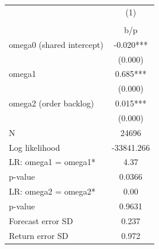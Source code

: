 {
\def\sym#1{\ifmmode^{#1}\else\(^{#1}\)\fi}
\begin{tabular}{l*{1}{c}}
\hline\hline
                    &\multicolumn{1}{c}{(1)}\\
                    &\multicolumn{1}{c}{}\\
                    &         b/p   \\
\hline
omega0 (shared intercept)&      -0.020***\\
                    &     (0.000)   \\
omega1              &       0.685***\\
                    &     (0.000)   \\
omega2 (order backlog)&       0.015***\\
                    &     (0.000)   \\
\hline
N                   &       24696   \\
Log likelihood      &  -33841.266   \\
LR: omega1 = omega1*&        4.37   \\
p-value             &      0.0366   \\
LR: omega2 = omega2*&        0.00   \\
p-value             &      0.9631   \\
Forecast error SD   &       0.237   \\
Return error SD     &       0.972   \\
\hline\hline
\end{tabular}
}
